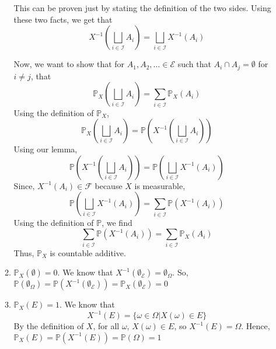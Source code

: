 \documentclass[12pt]{article}
\begin{document}
\begin{enumerate}[start=1,label={\bfseries Problem \arabic*:},leftmargin=1in]
\begin{enumerate}
        This can be proven just by stating the definition of the two sides. 
        Using these two facts, we get that
        \[
            X^{-1}(\bigsqcup_{i \in \mathcal{I}}A_{i}) = \bigsqcup_{i \in \mathcal{I}} X^{-1}(A_{i})
        \]
        
        Now, we want to show that for $A_1, A_{2}, \dots \in \mathcal{E}$ such that $A_{i} \cap A_{j} = \emptyset$ for $i \neq j$, that 
        \[
            \mathbb{P}_{X}(\bigsqcup_{i \in \mathcal{I}}A_{i}) = \sum_{i \in \mathcal{I}} \mathbb{P}_{X}(A_{i})
        \]
        Using the definition of $\mathbb{P}_{X}$,
        \[
            \mathbb{P}_{X}(\bigsqcup_{i \in \mathcal{I}}A_{i}) = \mathbb{P}(X^{-1}(\bigsqcup_{i \in \mathcal{I}}A_{i}))
        \]
        Using our lemma, 
        \[
            \mathbb{P}(X^{-1}(\bigsqcup_{i \in \mathcal{I}}A_{i})) = \mathbb{P}(\bigsqcup_{i \in \mathcal{I}}X^{-1}(A_{i}))
        \]
        Since, $X^{-1}(A_{i}) \in \mathcal{F}$ because $X$ is measurable, 
        \[
            \mathbb{P}(\bigsqcup_{i \in \mathcal{I}}X^{-1}(A_{i})) = \sum_{i \in \mathcal{I}} \mathbb{P}(X^{-1}(A_{i}))
        \] 
        Using the definition of $\mathbb{P}$, we find
        \[
            \sum_{i \in \mathcal{I}} \mathbb{P}(X^{-1}(A_{i})) = \sum_{i \in \mathcal{I}}\mathbb{P}_{X}(A_{i})
        \]
        Thus, $\mathbb{P}_{X}$ is countable additive.

        \item $\mathbb{P}_{X}(\emptyset) = 0$. We know that $X^{-1}(\emptyset_{\mathcal{E}}) = \emptyset_{\Omega}$.
        So, $\mathbb{P}(\emptyset_{\Omega}) = \mathbb{P}(X^{-1}(\emptyset_{\mathcal{E}})) = \mathbb{P}_{X}(\emptyset_{\mathcal{E}}) = 0$
        \item $\mathbb{P}_{X}(E) = 1$. We know that 
        \[
        X^{-1}(E) = \{ \omega \in \Omega | X(\omega) \in E\} 
        \]
        By the definition of $X$, for all $\omega$, $X(\omega) \in E$, so $X^{-1}(E) = \Omega$. 
        Hence, $\mathbb{P}_{X}(E) = \mathbb{P}(X^{-1}(E)) = \mathbb{P}(\Omega) = 1$
    \end{enumerate}

\end{enumerate}
\end{document}
